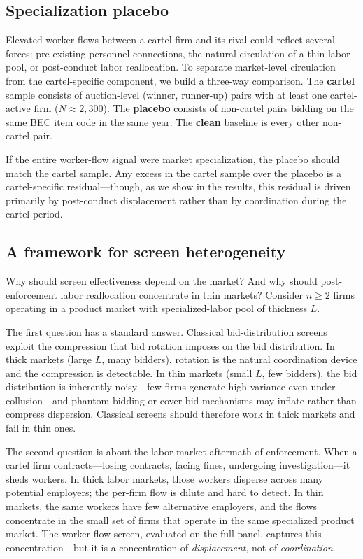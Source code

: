 \subsection{Specialization placebo}\label{sec:placebo}

Elevated worker flows between a cartel firm and its rival could reflect several forces: pre-existing personnel connections, the natural circulation of a thin labor pool, or post-conduct labor reallocation. To separate market-level circulation from the cartel-specific component, we build a three-way comparison. The \textbf{cartel} sample consists of auction-level (winner, runner-up) pairs with at least one cartel-active firm ($N \approx 2{,}300$). The \textbf{placebo} consists of non-cartel pairs bidding on the same BEC item code in the same year. The \textbf{clean} baseline is every other non-cartel pair.

If the entire worker-flow signal were market specialization, the placebo should match the cartel sample. Any excess in the cartel sample over the placebo is a cartel-specific residual---though, as we show in the results, this residual is driven primarily by post-conduct displacement rather than by coordination during the cartel period.

\subsection{A framework for screen heterogeneity}\label{sec:model}

Why should screen effectiveness depend on the market? And why should post-enforcement labor reallocation concentrate in thin markets? Consider $n \ge 2$ firms operating in a product market with specialized-labor pool of thickness $L$.

The first question has a standard answer. Classical bid-distribution screens exploit the compression that bid rotation imposes on the bid distribution. In thick markets (large $L$, many bidders), rotation is the natural coordination device and the compression is detectable. In thin markets (small $L$, few bidders), the bid distribution is inherently noisy---few firms generate high variance even under collusion---and phantom-bidding or cover-bid mechanisms may inflate rather than compress dispersion. Classical screens should therefore work in thick markets and fail in thin ones.

The second question is about the labor-market aftermath of enforcement. When a cartel firm contracts---losing contracts, facing fines, undergoing investigation---it sheds workers. In thick labor markets, those workers disperse across many potential employers; the per-firm flow is dilute and hard to detect. In thin markets, the same workers have few alternative employers, and the flows concentrate in the small set of firms that operate in the same specialized product market. The worker-flow screen, evaluated on the full panel, captures this concentration---but it is a concentration of \emph{displacement}, not of \emph{coordination}.

